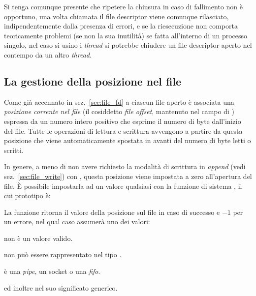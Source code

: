 Si tenga comunque presente che ripetere la chiusura in caso di fallimento non
è opportuno, una volta chiamata  il file descriptor viene comunque
rilasciato, indipendentemente dalla presenza di errori, e se la riesecuzione
non comporta teoricamente problemi (se non la sua inutilità) se fatta
all'interno di un processo singolo, nel caso si usino i \textit{thread} si
potrebbe chiudere un file descriptor aperto nel contempo da un altro
\textit{thread}.

\subsection{La gestione della posizione nel file}
\label{sec:file_lseek}

Come già accennato in sez.~\ref{sec:file_fd} a ciascun file aperto è associata
una \textsl{posizione corrente nel file} (il cosiddetto \textit{file offset},
mantenuto nel campo  di ) espressa da un numero
intero positivo che esprime il numero di byte dall'inizio del file. Tutte le
operazioni di lettura e scrittura avvengono a partire da questa posizione che
viene automaticamente spostata in avanti del numero di byte letti o scritti.

In genere, a meno di non avere richiesto la modalità di scrittura in
\textit{append} (vedi sez.~\ref{sec:file_write}) con , questa
posizione viene impostata a zero all'apertura del file. È possibile impostarla
ad un valore qualsiasi con la funzione di sistema , il cui
prototipo è:

\begin{funcproto}{
}

{La funzione ritorna il valore della posizione sul file in caso di successo e
  $-1$ per un errore, nel qual caso  assumerà uno dei valori:
  \begin{errlist}
    \item[\errcode{EINVAL}]  non è un valore valido.
    \item[\errcode{EOVERFLOW}]  non può essere rappresentato nel
      tipo .
    \item[\errcode{ESPIPE}]  è una \textit{pipe}, un socket o una
      \textit{fifo}.
  \end{errlist}
  ed inoltre  nel suo significato generico.}
\end{funcproto}

